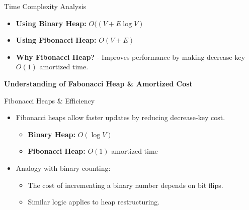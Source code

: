 \documentclass{beamer}
\begin{document}
\begin{frame}{Time Complexity Analysis}
    \begin{tcolorbox}[colback=gray!10, colframe=red!75!black, title=Time Complexity of Dijkstra’s Algorithm]
        \begin{itemize}
            \item \textbf{Using Binary Heap:} \(O((V+ E\log V)\)
            \item \textbf{Using Fibonacci Heap:} \(O(V + E)\)
            \item \textbf{Why Fibonacci Heap?}  
                - Improves performance by making decrease-key \(O(1)\) amortized time.
        \end{itemize}
    \end{tcolorbox}
\end{frame}

\begin{frame}
    \centering
     \begin{tcolorbox}[colback=white!10, colframe=gray!10, boxrule=2mm, arc=5mm, width=0.8\textwidth]
     \centering
    \Large\textbf{\textcolor{customred}{Understanding of Fabonacci Heap \& Amortized Cost}}
    \end{tcolorbox}
\end{frame}

\begin{frame}{Fibonacci Heaps \& Efficiency}
    \begin{itemize}
        \item Fibonacci heaps allow faster updates by reducing decrease-key cost.
             \begin{tcolorbox}[colback=gray!10,colframe=red!75!black,title=Time Complexity of Decrease-Key]
    \begin{itemize}
        \item \textbf{Binary Heap:} $O(\log V)$
        \item \textbf{Fibonacci Heap:} $O(1)$ amortized time
    \end{itemize}
    \end{tcolorbox}
        \item Analogy with binary counting: \begin{itemize}
            \item The cost of incrementing a binary number depends on bit flips.
            \item Similar logic applies to heap restructuring.
        \end{itemize}
    \end{itemize}
\end{frame}
\end{document}
